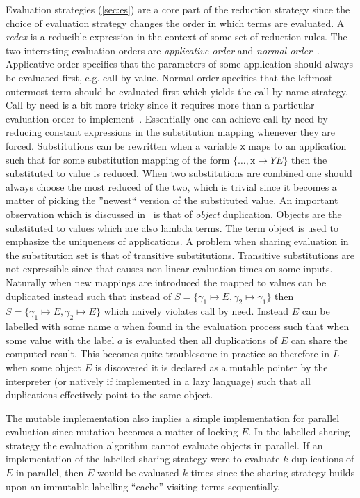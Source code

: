 \documentclass[11pt,oneside,a4paper]{report}
\begin{document}
Evaluation strategies (\autoref{sec:es}) are a core part of the reduction strategy since the choice of evaluation strategy changes the order in which terms are evaluated.
A \textit{redex} is a reducible expression in the context of some set of reduction rules.
The two interesting evaluation orders are \textit{applicative order} and \textit{normal order}~\cite{sestoft2002demonstrating}.
Applicative order specifies that the parameters of some application should always be evaluated first, e.g. call by value.
Normal order specifies that the leftmost outermost term should be evaluated first which yields the call by name strategy.
Call by need is a bit more tricky since it requires more than a particular evaluation order to implement~\cite{levy1988sharing}.
Essentially one can achieve call by need by reducing constant expressions in the substitution mapping whenever they are forced.
Substitutions can be rewritten when a variable \texttt{x} maps to an application such that for some substitution mapping of the form $\{ \dots, \texttt{x} \mapsto Y E \}$ then the substituted to value is reduced.
When two substitutions are combined one should always choose the most reduced of the two, which is trivial since it becomes a matter of picking the ''newest`` version of the substituted value.
An important observation which is discussed in~\cite{levy1988sharing} is that of \textit{object} duplication.
Objects are the substituted to values which are also lambda terms.
The term object is used to emphasize the uniqueness of applications.
A problem when sharing evaluation in the substitution set is that of transitive substitutions.
Transitive substitutions are not expressible since that causes non-linear evaluation times on some inputs.
Naturally when new mappings are introduced the mapped to values can be duplicated instead such that instead of $S = \{ \gamma_1 \mapsto E, \gamma_2 \mapsto \gamma_1 \}$ then $S = \{ \gamma_1 \mapsto E, \gamma_2 \mapsto E \}$ which naively violates call by need.
Instead $E$ can be labelled with some name $a$ when found in the evaluation process such that when some value with the label $a$ is evaluated then all duplications of $E$ can share the computed result.
This becomes quite troublesome in practice so therefore in $L$ when some object $E$ is discovered it is declared as a mutable pointer by the interpreter (or natively if implemented in a lazy language) such that all duplications effectively point to the same object.
\begin{remark}
    The mutable implementation also implies a simple implementation for parallel evaluation since mutation becomes a matter of locking $E$.
    In the labelled sharing strategy the evaluation algorithm cannot evaluate objects in parallel.
    If an implementation of the labelled sharing strategy were to evaluate $k$ duplications of $E$ in parallel, then $E$ would be evaluated $k$ times since the sharing strategy builds upon an immutable labelling ``cache'' visiting terms sequentially.
\end{remark}
\end{document}
